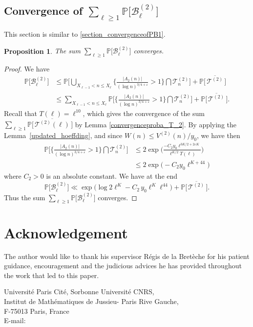 \documentclass{article}
\newtheorem{prop}[theorem]{Proposition}
\begin{document}
\subsection{Convergence of \texorpdfstring{$\sum_{\ell \geqslant 1} \mathbb{P}\big[ \mathcal{B}^{(2)}_\ell\big]$}.}
This section is similar to \ref{section_convergenceofPB1}.
\begin{prop}
    The sum $\sum_{\ell \geqslant 1} \mathbb{P}\big[ \mathcal{B}^{(2)}_\ell\big]$ converges.
\end{prop}
\begin{proof}[Proof]
    We have
    $$
    \begin{aligned}
        \mathbb{P}\big[ \mathcal{B}^{(2)}_\ell\big] & \leqslant \mathbb{P}\bigg[\bigcup_{X_{\ell-1} < n \leqslant   X_{\ell}} \bigg\{  \frac{|A_2(n)|}{(\log n )^{3/4 + \varepsilon}}> 1  \bigg\}\bigcap \mathcal{T}_n^{(2)} \bigg]+ \mathbb{P}\big[\,\overline{\mathcal{T}^{(2)}} \,\big]
        \\ & \leqslant \sum_{X_{\ell-1} < n \leqslant   X_{\ell}} \mathbb{P}\bigg[ \bigg\{  \frac{|A_2(n)|}{(\log n )^{3/4 + \varepsilon}}> 1  \bigg\}\bigcap \mathcal{T}_n^{(2)} \bigg] + \mathbb{P}\big[\,\overline{\mathcal{T}^{(2)}} \,\big].
    \end{aligned}
    $$
    Recall that $T(\ell)=\ell^{10}$, which gives the convergence of the sum $\sum_{\ell \geqslant 1}\mathbb{P}\big[\,\overline{\mathcal{T}^{(2)}(\ell)} \,\big]$ by Lemma \ref{convergenceproba_T_2}. By applying the  Lemma~\ref{updated_hoeffding}, and since $W(n)\leqslant V^{(2)}(n)/y_0$, we have then
    $$
    \begin{aligned}
        \mathbb{P}\bigg[ \bigg\{  \frac{|A_2(n)|}{(\log n )^{3/4 + \varepsilon}}> 1  \bigg\}\bigcap \mathcal{T}_n^{(2)} \bigg] & \leqslant 2 \exp \bigg(\frac{-C_2 y_0\ell^{3K/2+2\varepsilon K}}{\ell^{K/2}T(\ell)} \bigg)
        \\ &\leqslant  2 \exp \bigg(-C_2 y_0 \ell^{K+44}\bigg)
    \end{aligned}
    $$
    where $C_2>0$ is an absolute constant. We have at the end
      $$
      \mathbb{P}\big[\mathcal{B}_{\ell}^{(2)}\big] \ll  \exp \bigg( \log 2\ell^{K}-C_2\,y_0 \ell^{K} \ell^{44} \bigg) + \mathbb{P}\big[\,\overline{\mathcal{T}^{(2)}} \,\big].
      $$
      Thus the sum $\sum_{\ell \geqslant 1}\mathbb{P}\big[\mathcal{B}_{\ell}^{(2)}\big]$ converges.
\end{proof}
\section*{Acknowledgement}
The author would like to thank his supervisor Régis de la Bretèche for his patient guidance, encouragement and the judicious advices he has provided throughout the work that led to this paper.





\begin{center}
Université Paris Cité, Sorbonne Université
CNRS,\\
Institut de Mathématiques de Jussieu- Paris Rive Gauche,\\
F-75013 Paris, France\\
E-mail: \author{rachid.caich@imj-prg.fr}
\end{center}
\end{document}
